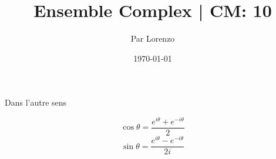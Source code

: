 \documentclass[a4paper, 12pt]{article}
\title{Ensemble Complex | CM: 10}
\author{Par Lorenzo}
\date{\today}
\begin{document}
\maketitle


Dans l'autre sens

$$
\cos \theta = \dfrac{e^{i\theta} + e^{-i \theta}}{2}
$$
$$
\sin \theta = \dfrac{e^{i\theta} - e^{-i \theta}}{2i}
$$
\end{document}
